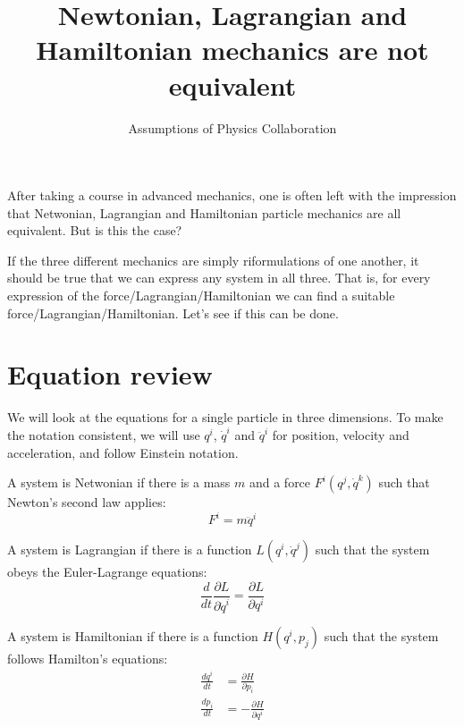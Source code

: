\documentclass[11pt]{article}
\begin{document}
	
	
	\title{Newtonian, Lagrangian and Hamiltonian mechanics are not equivalent}
	\author{Assumptions of Physics Collaboration}
	
	\date{}
	
	\maketitle
	
After taking a course in advanced mechanics, one is often left with the impression that Netwonian, Lagrangian and Hamiltonian particle mechanics are all equivalent. But is this the case?

If the three different mechanics are simply riformulations of one another, it should be true that we can express any system in all three. That is, for every expression of the force/Lagrangian/Hamiltonian we can find a suitable force/Lagrangian/Hamiltonian. Let's see if this can be done.

\section{Equation review}

We will look at the equations for a single particle in three dimensions. To make the notation consistent, we will use $q^i$, $\dot{q}^i$ and $\ddot{q}^i$ for position, velocity and acceleration, and follow Einstein notation.

A system is Netwonian if there is a mass $m$ and a force $F^i(q^j,\dot{q}^k)$ such that Newton's second law applies:
\begin{equation}
\label{Fma}
F^i=m\ddot{q}^i
\end{equation}

A system is Lagrangian if there is a function $L(q^i,\dot{q}^j)$ such that the system obeys the Euler-Lagrange equations:
\begin{equation}
\label{EulerLagrange}
 \frac{d}{dt} \frac{\partial L}{\partial \dot{q}^i} = \frac{\partial L}{\partial q^i}
\end{equation}

A system is Hamiltonian if there is a function $H(q^i,p_j)$ such that the system follows Hamilton's equations:
\begin{equation}
\begin{aligned}
\frac{dq^i}{dt} &= \frac{\partial H}{\partial p_i} \\
\frac{dp_i}{dt} &= - \frac{\partial H}{\partial q^i}
\end{aligned}
\label{Hamilton}
\end{equation}
\end{document}
